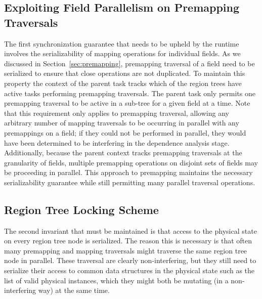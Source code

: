 \subsection{Exploiting Field Parallelism on Premapping Traversals}
\label{subsec:parpremap}
The first synchronization guarantee that needs to be
upheld by the runtime involves the serializability of
mapping operations for individual fields. As we
discussed in Section~\ref{sec:premapping}, premapping
traversal of a field need to be serialized to ensure
that close operations are not duplicated. To maintain 
this property the context of the parent task
tracks which of the region trees have active
tasks performing premapping traversals. The parent
task only permits one premapping traversal to be 
active in a sub-tree for a given field at a time.
Note that this requirement only applies to premapping
traversal, allowing any arbitrary number of mapping
traversals to be occurring in parallel with any premappings
on a field; if they could not be performed in parallel, 
they would have been determined to be interfering in the 
dependence analysis stage. Additionally, because the
parent context tracks premapping traversals at the
granularity of fields, multiple premapping operations
on disjoint sets of fields may be proceeding in parallel.
This approach to premapping maintains the necessary
serializability guarantee while still permitting many
parallel traversal operations.

\subsection{Region Tree Locking Scheme}
\label{subsec:treelocking}
The second invariant that must be maintained is that
access to the physical state on every region tree 
node is serialized. The reason this is necessary is
that often many premapping and mapping traversals
might traverse the same region tree node in 
parallel. These traversal are clearly non-interfering,
but they still need to serialize their access to
common data structures in the physical state such
as the list of valid physical instances, which they
might both be mutating (in a non-interfering way)
at the same time.


